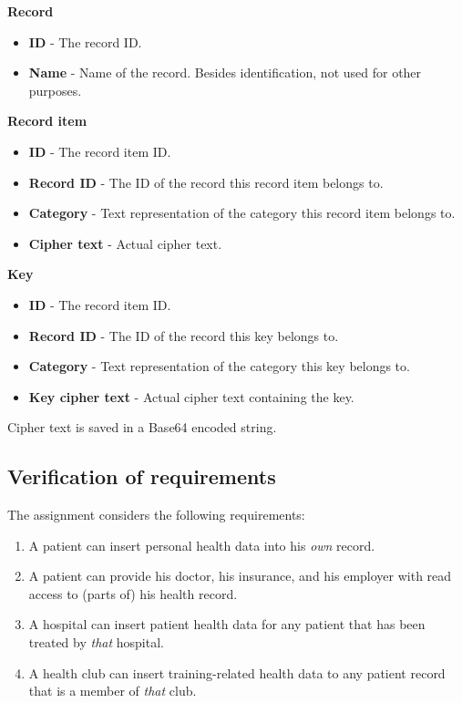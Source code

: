 \documentclass[a4paper]{article}
\begin{document}
		\textbf{Record}
		\begin{itemize}
			\item \textbf{ID} - The record ID.
			\item \textbf{Name} - Name of the record. Besides identification, not used for other purposes.
		\end{itemize}
		
		\textbf{Record item}
		\begin{itemize}
			\item \textbf{ID} - The record item ID.
			\item \textbf{Record ID} - The ID of the record this record item belongs to.
			\item \textbf{Category} - Text representation of the category this record item belongs to.
			\item \textbf{Cipher text} - Actual cipher text.
		\end{itemize}
		
		\textbf{Key}
		\begin{itemize}
			\item \textbf{ID} - The record item ID.
			\item \textbf{Record ID} - The ID of the record this key belongs to.
			\item \textbf{Category} - Text representation of the category this key belongs to.
			\item \textbf{Key cipher text} - Actual cipher text containing the key.
		\end{itemize}
	
		Cipher text is saved in a Base64 encoded string.
	
	\subsection{Verification of requirements}
		The assignment considers the following requirements:
		
		\begin{enumerate}
			\item{A patient can insert personal health data into his \textit{own} record.}
			\item{A patient can provide his doctor, his insurance, and his employer with read access to (parts of) his health record.}
			\item{A hospital can insert patient health data for any patient that has been treated by \textit{that} hospital.}
			\item{A health club can insert training-related health data to any patient record that is a member of \textit{that} club.}
		\end{enumerate}
		
\end{document}
